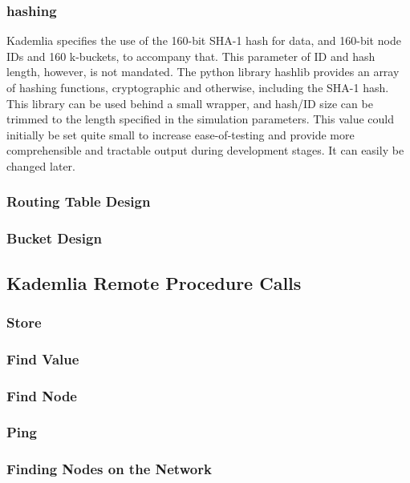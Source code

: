 \documentclass[12pt]{report}
\begin{document}
            \subsubsection{hashing}
                Kademlia specifies the use of the 160-bit SHA-1 hash for data,
                and 160-bit node IDs and 160 k-buckets, to accompany that.
                This parameter of ID and hash length, however, is not mandated.
                The python library hashlib provides an array of hashing
                functions, cryptographic and otherwise, including the SHA-1
                hash.  This library can be used behind a small wrapper, and
                hash/ID size can be trimmed to the length specified in the
                simulation parameters.  This value could initially be set quite
                small to increase ease-of-testing and provide more
                comprehensible and tractable output during development stages.
                It can easily be changed later.
            \subsubsection{Routing Table Design}
            \subsubsection{Bucket Design}
        \subsection{Kademlia Remote Procedure Calls}
            \subsubsection{Store}
            \subsubsection{Find Value}
            \subsubsection{Find Node}
            \subsubsection{Ping}
            \subsubsection{Finding Nodes on the Network}
\end{document}
